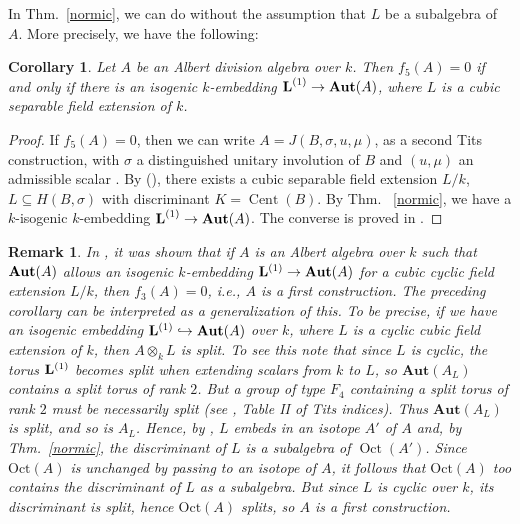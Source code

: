 \documentclass{amsart}
\newtheorem{cor}[equation]{Corollary}
\newtheorem{rem}[equation]{Remark}
\theoremstyle{definition} %
\theoremstyle{remark} %
\DeclareMathOperator{\Cent}{Cent}
\DeclareMathOperator{\Oct}{Oct}
\newcommand{\bfAut}{\mathbf{Aut}}
\renewcommand{\:}{\colon\,}
\numberwithin{equation}{section}
\begin{document}
In Thm.~\ref{normic}, we can do without the assumption that $L$ be a subalgebra of $A$. More precisely, we have the following:
\begin{cor}\label{f5} Let $A$ be an Albert division algebra over $k$. Then $f_5(A)=0$ if and only if there is an isogenic $k$-embedding $\text{\bf L}^{(1)}\rightarrow\text{\bf Aut}(A)$, where $L$ is a cubic separable field extension of $k$.
\end{cor}
\begin{proof} If $f_5(A)=0$, then we can write $A=J(B,\sigma, u, \mu)$, as a second Tits construction, with $\sigma$ a distinguished unitary involution of $B$ and $(u,\mu)$ an admissible scalar \cite[Thm.~4.4]{MR2063796}. By (\cite[Them. 3.1]{MR2063796}), there exists a cubic separable field extension $L/k$, $L\subseteq H(B,\sigma)$ with discriminant $K = \Cent(B)$. By Thm. ~\ref{normic}, we have a $k$-isogenic $k$-embedding $\text{\bf L}^{(1)}\rightarrow\text{\bf Aut}(A)$. The converse is proved in 
\cite{MR3795634}.
\end{proof}
\begin{rem}
\emph{In \cite[Thm.~4.3]{MR3795634}, it was shown that if $A$ is an Albert algebra over $k$ such that $\text{\bf Aut}(A)$ allows an isogenic $k$-embedding ${\bf L}^{(1)}\rightarrow{\bf Aut}(A)$ for a cubic cyclic
field extension $L/k$, then $f_3(A)=0$, i.e., $A$ is a first construction. The preceding corollary can be interpreted as a generalization of this. To be precise, if we have an isogenic embedding ${\bf L}^{(1)}\hookrightarrow\text{\bf Aut}(A)$ over $k$, where $L$ is a cyclic cubic field extension of $k$, then $A\otimes_k L$ is split. To see this note that since $L$ is cyclic, the torus ${\bf L}^{(1)}$ becomes split when extending scalars from $k$ to $L$, so $\bfAut(A_L)$ contains a split torus of rank $2$. But a group of type $F_4$ containing a split torus of rank $2$ must be necessarily split (see \cite{MR224710}, Table II of Tits indices). Thus $\bfAut(A_L)$ is split, and so is $A_L$. Hence, by \cite[Thm.~2]{MR73558}, $L$ embeds in an isotope $A'$ of $A$ and, by Thm.~\ref{normic}, the discriminant of $L$ is a subalgebra of $\Oct(A')$. Since $\text{Oct}(A)$ is unchanged by passing to an isotope of $A$, it follows that $\text{Oct}(A)$ too contains the discriminant of $L$ as a subalgebra. But since $L$ is cyclic over $k$, its discriminant is split, hence $\text{Oct}(A)$ splits, so $A$ is a first construction.}
\end{rem}
\end{document}
